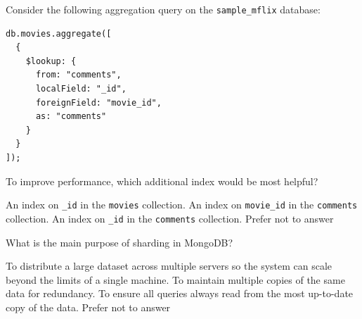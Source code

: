 \documentclass[12pt,answers]{exam}
\begin{document}
\begin{questions}
\begin{minipage}{\linewidth}
\question[2]
Consider the following aggregation query on the \texttt{sample\_mflix} database:

\begin{verbatim}
db.movies.aggregate([
  {
    $lookup: {
      from: "comments",
      localField: "_id",
      foreignField: "movie_id",
      as: "comments"
    }
  }
]);
\end{verbatim}

To improve performance, which additional index would be most helpful?

\begin{checkboxes}
    \choice An index on \texttt{\_id} in the \texttt{movies} collection.
    \CorrectChoice An index on \texttt{movie\_id} in the \texttt{comments} collection.
    \choice An index on \texttt{\_id} in the \texttt{comments} collection.
    \choice Prefer not to answer
\end{checkboxes}

\end{minipage}


\question[2]
What is the main purpose of sharding in MongoDB?

\begin{checkboxes}
    \CorrectChoice To distribute a large dataset across multiple servers so the system can scale beyond the limits of a single machine.
    \choice To maintain multiple copies of the same data for redundancy.
    \choice To ensure all queries always read from the most up-to-date copy of the data.
    \choice Prefer not to answer
\end{checkboxes}



\end{questions}
\end{document}
